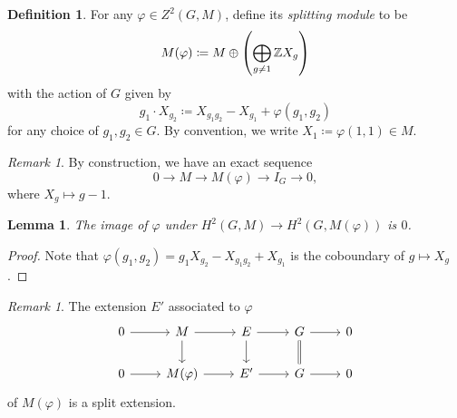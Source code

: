 \documentclass[leqno, openany]{memoir}
\newtheorem{lem}[thm]{Lemma}
\theoremstyle{definition}
\newtheorem{defn}[thm]{Definition}
\theoremstyle{remark}
\newtheorem{rmk}[thm]{Remark}
\theoremstyle{plain}
\theoremstyle{definition}
\theoremstyle{remark}
\newcommand{\Z}{\mathbb{Z}}
\begin{document}
\begin{defn} For any $\varphi \in Z^2(G, M)$, define its \textit{splitting
    module} to be \[ M(\varphi) \coloneqq M \oplus \qty(\bigoplus_{g \neq 1} \Z
        X_g) \] with the action of $G$ given by \[ g_1 \cdot X_{g_2} \coloneqq
    X_{g_1g_2} - X_{g_1} + \varphi(g_1,g_2) \] for any choice of $g_1, g_2 \in
G$. By convention, we write $X_1 \coloneqq \varphi(1,1) \in M$.  \end{defn}

\begin{rmk} By construction, we have an exact sequence \[ 0 \to M \to
M(\varphi) \to I_G \to 0, \] where $X_g \mapsto g-1$.  \end{rmk}

\begin{lem} The image of $\varphi$ under $H^2(G, M) \to H^2(G, M(\varphi))$ is
$0$.  \end{lem}

\begin{proof} Note that $\varphi(g_1,g_2) = g_1 X_{g_2} - X_{g_1g_2} + X_{g_1}$
is the coboundary of $g \mapsto X_g$.  \end{proof}

\begin{rmk} The extension $E'$ associated to $\varphi$ \begin{equation*}
    \begin{tikzcd} 0 \ar{r} & M \ar{r} \ar{d} & E \ar{r} \ar{d} & G \ar{r}
    \ar[equals]{d} & 0 \\ 0 \ar{r} & M(\varphi) \ar{r} & E' \ar{r} & G \ar{r} &
0 \end{tikzcd} \end{equation*} of $M(\varphi)$ is a split extension.  \end{rmk}
\end{document}
